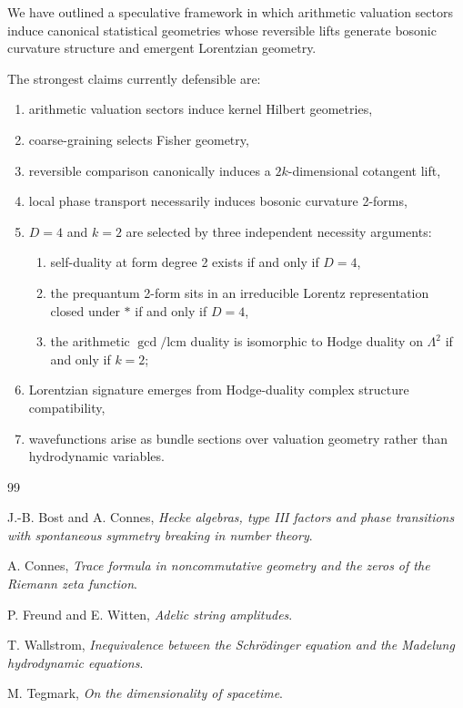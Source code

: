 \documentclass[11pt]{article}
\begin{document}
We have outlined a speculative framework in which arithmetic valuation sectors induce canonical statistical geometries whose reversible lifts generate bosonic curvature structure and emergent Lorentzian geometry.

The strongest claims currently defensible are:

\begin{enumerate}[leftmargin=1.5cm]
\item arithmetic valuation sectors induce kernel Hilbert geometries,
\item coarse-graining selects Fisher geometry,
\item reversible comparison canonically induces a $2k$-dimensional cotangent lift,
\item local phase transport necessarily induces bosonic curvature 2-forms,
\item $D=4$ and $k=2$ are selected by three independent necessity arguments:
  \begin{enumerate}[label=(\alph*)]
  \item self-duality at form degree 2 exists if and only if $D=4$,
  \item the prequantum 2-form sits in an irreducible Lorentz representation
        closed under $*$ if and only if $D=4$,
  \item the arithmetic $\gcd/\mathrm{lcm}$ duality is isomorphic to Hodge
        duality on $\Lambda^2$ if and only if $k=2$;
  \end{enumerate}
\item Lorentzian signature emerges from Hodge-duality complex structure compatibility,
\item wavefunctions arise as bundle sections over valuation geometry rather than hydrodynamic variables.
\end{enumerate}

\begin{thebibliography}{99}

J.-B. Bost and A. Connes,
\textit{Hecke algebras, type III factors and phase transitions with spontaneous symmetry breaking in number theory}.

A. Connes,
\textit{Trace formula in noncommutative geometry and the zeros of the Riemann zeta function}.

P. Freund and E. Witten,
\textit{Adelic string amplitudes}.

T. Wallstrom,
\textit{Inequivalence between the Schr\"odinger equation and the Madelung hydrodynamic equations}.

M. Tegmark,
\textit{On the dimensionality of spacetime}.

\end{thebibliography}
\end{document}
